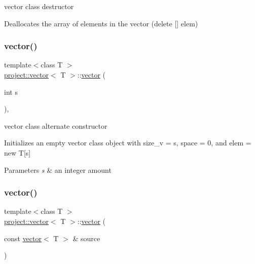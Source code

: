 vector class destructor 

Deallocates the array of elements in the vector (delete \mbox{[}\mbox{]} elem) \mbox{\label{classproject_1_1vector_ad065d3806d059712feea6fb639b35f87}} 
\subsubsection{\texorpdfstring{vector()}{vector()}\hspace{0.1cm}{\footnotesize\ttfamily [2/4]}}
{\footnotesize\ttfamily template$<$class T $>$ \\
\mbox{\hyperlink{classproject_1_1vector}{project\+::vector}}$<$ T $>$\+::\mbox{\hyperlink{classproject_1_1vector}{vector}} (\begin{DoxyParamCaption}\item[{int}]{s }\end{DoxyParamCaption})\hspace{0.3cm}{\ttfamily [inline]}, {\ttfamily [explicit]}}



vector class alternate constructor 

Initializes an empty vector class object with size\+\_\+v = s, space = 0, and elem = new T\mbox{[}s\mbox{]} 
\begin{DoxyParams}{Parameters}
{\em s} & an integer amount \\
\hline
\end{DoxyParams}
\mbox{\label{classproject_1_1vector_af93a6afbfc6eeefb9b712660685e17cf}} 
\subsubsection{\texorpdfstring{vector()}{vector()}\hspace{0.1cm}{\footnotesize\ttfamily [3/4]}}
{\footnotesize\ttfamily template$<$class T $>$ \\
\mbox{\hyperlink{classproject_1_1vector}{project\+::vector}}$<$ T $>$\+::\mbox{\hyperlink{classproject_1_1vector}{vector}} (\begin{DoxyParamCaption}\item[{const \mbox{\hyperlink{classproject_1_1vector}{vector}}$<$ T $>$ \&}]{source }\end{DoxyParamCaption})\hspace{0.3cm}{\ttfamily [inline]}}



